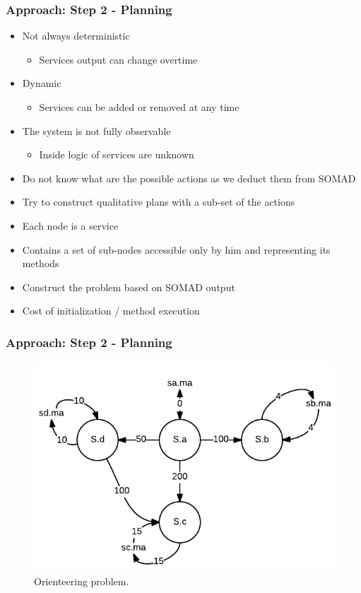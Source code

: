 \documentclass{beamer}
\begin{document}
\begin{frame}
\frametitle{Approach: Step 2 - Planning}
\begin{itemize}
\item Not always deterministic 
\begin{itemize}
\item Services output can change
overtime
\end{itemize}
\item Dynamic 
\begin{itemize}
\item Services can be added or removed at any time
\end{itemize}
\item The system is not fully observable
\begin{itemize} 
\item Inside logic of services are unknown
\end{itemize}
\item Do not know what are the possible actions as we deduct them from SOMAD
\item Try to construct qualitative plans with a sub-set of the actions
\end{itemize}
\end{frame}

\begin{frame}
\begin{itemize}
\item Each node is a service
\item Contains a set of sub-nodes
accessible only by him and representing its methods
\item Construct the problem based on SOMAD output
\item Cost of initialization / method execution
\end{itemize}
\frametitle{Approach: Step 2 - Planning}
\begin{figure}
    \centering
	\includegraphics[scale=0.3]{media/orienteering.png}
 	\caption{Orienteering problem.}
    \label{fig:orienteering}
\end{figure}
\end{frame}
\end{document}
